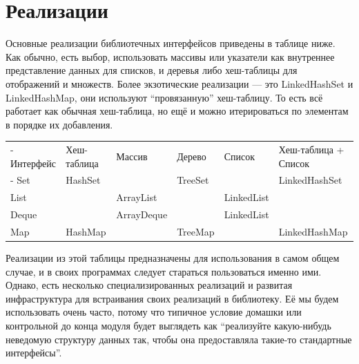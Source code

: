 \documentclass[a5paper]{article}
\begin{document}
\section{Реализации}

Основные реализации библиотечных интерфейсов приведены в таблице ниже. Как обычно, есть выбор, использовать массивы или указатели как внутреннее представление данных для списков, и деревья либо хеш-таблицы для отображений и множеств. Более экзотические реализации --- это LinkedHashSet и LinkedHashMap, они используют ``провязанную'' хеш-таблицу. То есть всё работает как обычная хеш-таблица, но ещё и можно итерироваться по элементам в порядке их добавления.

\begin{footnotesize}
	\begin{tabu} {| X[1 l p] | X[0.7 l p] | X[1 l p] | X[0.7 l p] | X[1 l p] | X[1.3 l p] |}
		\tabucline-
		Интерфейс  & Хеш-таблица  & Массив      & Дерево   & Список      & Хеш-таблица + Список  \\
		\tabucline-
		\everyrow{\tabucline-}
		Set        & HashSet      &             & TreeSet  &             & LinkedHashSet         \\
		List       &              & ArrayList   &          & LinkedList  &                       \\
		Deque      &              & ArrayDeque  &          & LinkedList  &                       \\
		Map        & HashMap      &             & TreeMap  &             & LinkedHashMap         \\
	\end{tabu}
\end{footnotesize}

Реализации из этой таблицы предназначены для использования в самом общем случае, и в своих программах следует стараться пользоваться именно ими. Однако, есть несколько специализированных реализаций и развитая инфраструктура для встраивания своих реализаций в библиотеку. Её мы будем использовать очень часто, потому что типичное условие домашки или контрольной до конца модуля будет выглядеть как ``реализуйте какую-нибудь неведомую структуру данных так, чтобы она предоставляла такие-то стандартные интерфейсы''.
\end{document}
